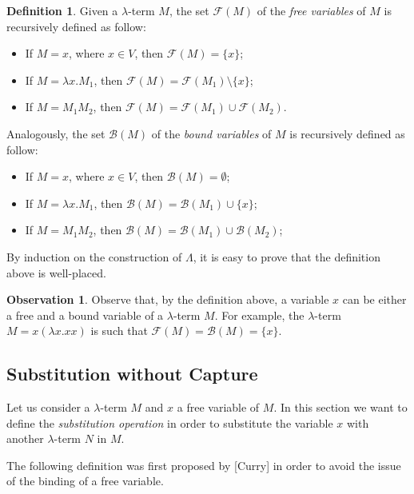 \documentclass[a4paper,11pt]{article}
\theoremstyle{definition}
\newtheorem{defn}{Definition}
\newtheorem{oss}{Observation}
\newcommand{\FF}{\mathcal{F}}
\newcommand{\BB}{\mathcal{B}}
\begin{document}
\begin{defn}
  Given a $\lambda$-term $M$, the set $\FF(M)$ of the \textit{free variables}
  of $M$ is recursively defined as follow:
  \begin{itemize}
    \item If $M=x$, where $x\in V$, then $\FF(M)=\{x\}$;
    \item If $M=\lambda x.M_1$, then $\FF(M)=\FF(M_1)\setminus\{x\}$;
    \item If $M=M_1M_2$, then $\FF(M)=\FF(M_1)\cup\FF(M_2)$.
  \end{itemize}
  Analogously, the set $\BB(M)$ of the \textit{bound variables} of $M$
  is recursively defined as follow:
  \begin{itemize}
    \item If $M=x$, where $x\in V$, then $\BB(M)=\emptyset$;
    \item If $M=\lambda x.M_1$, then $\BB(M) = \BB(M_1)\cup \{x\}$;
    \item If $M=M_1M_2$, then $\BB(M)=\BB(M_1)\cup\BB(M_2)$;
  \end{itemize}
\end{defn}
By induction on the construction of $\Lambda$, it is easy to prove that
the definition above is well-placed.

\begin{oss}
  Observe that, by the definition above, a variable $x$ can be either a free and 
  a bound variable of a $\lambda$-term $M$. For example, the 
  $\lambda$-term $M=x(\lambda x.xx)$ is such that $\FF(M) = \BB(M) = \{x\}$.
\end{oss}

\subsection{Substitution without Capture}
Let us consider a $\lambda$-term $M$ and $x$ a free variable of $M$. In this
section we want to define the \textit{substitution operation} in order to
substitute the variable $x$ with another $\lambda$-term $N$ in $M$.

The following definition was first proposed by [Curry] in order to avoid the
issue of the binding of a free variable.
\end{document}
